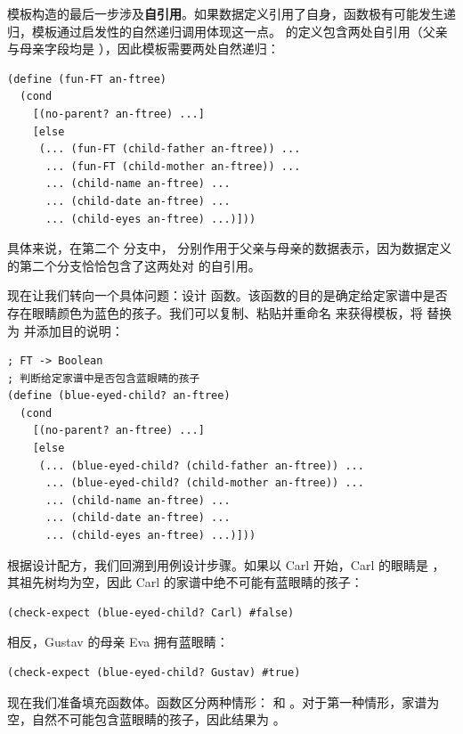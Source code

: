 模板构造的最后一步涉及\textbf{自引用}。如果数据定义引用了自身，函数极有可能发生递归，模板通过启发性的自然递归调用体现这一点。 的定义包含两处自引用（父亲与母亲字段均是 ），因此模板需要两处自然递归：

\begin{lstlisting}[language=BSL]
(define (fun-FT an-ftree)
  (cond
    [(no-parent? an-ftree) ...]
    [else
     (... (fun-FT (child-father an-ftree)) ...
      ... (fun-FT (child-mother an-ftree)) ...
      ... (child-name an-ftree) ...
      ... (child-date an-ftree) ...
      ... (child-eyes an-ftree) ...)]))
\end{lstlisting}

具体来说，在第二个  分支中， 分别作用于父亲与母亲的数据表示，因为数据定义的第二个分支恰恰包含了这两处对  的自引用。

现在让我们转向一个具体问题：设计  函数。该函数的目的是确定给定家谱中是否存在眼睛颜色为蓝色的孩子。我们可以复制、粘贴并重命名  来获得模板，将  替换为  并添加目的说明：

\begin{lstlisting}[language=BSL]
; FT -> Boolean
; 判断给定家谱中是否包含蓝眼睛的孩子
(define (blue-eyed-child? an-ftree)
  (cond
    [(no-parent? an-ftree) ...]
    [else
     (... (blue-eyed-child? (child-father an-ftree)) ...
      ... (blue-eyed-child? (child-mother an-ftree)) ...
      ... (child-name an-ftree) ...
      ... (child-date an-ftree) ...
      ... (child-eyes an-ftree) ...)]))
\end{lstlisting}

根据设计配方，我们回溯到用例设计步骤。如果以 Carl 开始，Carl 的眼睛是 ，其祖先树均为空，因此 Carl 的家谱中绝不可能有蓝眼睛的孩子：

\begin{lstlisting}[language=BSL]
(check-expect (blue-eyed-child? Carl) #false)
\end{lstlisting}

相反，Gustav 的母亲 Eva 拥有蓝眼睛：

\begin{lstlisting}[language=BSL]
(check-expect (blue-eyed-child? Gustav) #true)
\end{lstlisting}

现在我们准备填充函数体。函数区分两种情形： 和 。对于第一种情形，家谱为空，自然不可能包含蓝眼睛的孩子，因此结果为 。

